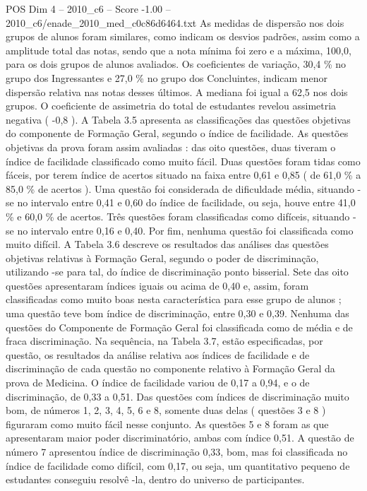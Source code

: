 \begin{textsample}{POS Dim 4 – 2010\_c6 – Score -1.00 – 2010\_c6/enade\_2010\_med\_c0c86d6464.txt}
As medidas de dispersão nos dois grupos de alunos foram similares, como indicam os desvios padrões, assim como a amplitude total das notas, sendo que a nota mínima foi zero e a máxima, 100,0, para os dois grupos de alunos avaliados.
Os coeficientes de variação, 30,4 \% no grupo dos Ingressantes e 27,0 \% no grupo dos Concluintes, indicam menor dispersão relativa nas notas desses últimos.
A mediana foi igual a 62,5 nos dois grupos.
O coeficiente de assimetria do total de estudantes revelou assimetria negativa ( -0,8 ).
A Tabela 3.5 apresenta as classificações das questões objetivas do componente de Formação Geral, segundo o índice de facilidade.
As questões objetivas da prova foram assim avaliadas : das oito questões, duas tiveram o índice de facilidade classificado como muito fácil.
Duas questões foram tidas como fáceis, por terem índice de acertos situado na faixa entre 0,61 e 0,85 ( de 61,0 \% a 85,0 \% de acertos ).
Uma questão foi considerada de dificuldade média, situando -se no intervalo entre 0,41 e 0,60 do índice de facilidade, ou seja, houve entre 41,0 \% e 60,0 \% de acertos.
Três questões foram classificadas como difíceis, situando -se no intervalo entre 0,16 e 0,40.
Por fim, nenhuma questão foi classificada como muito difícil.
A Tabela 3.6 descreve os resultados das análises das questões objetivas relativas à Formação Geral, segundo o poder de discriminação, utilizando -se para tal, do índice de discriminação ponto bisserial.
Sete das oito questões apresentaram índices iguais ou acima de 0,40 e, assim, foram classificadas como muito boas nesta característica para esse grupo de alunos ; uma questão teve bom índice de discriminação, entre 0,30 e 0,39.
Nenhuma das questões do Componente de Formação Geral foi classificada como de média e de fraca discriminação.
Na sequência, na Tabela 3.7, estão especificadas, por questão, os resultados da análise relativa aos índices de facilidade e de discriminação de cada questão no componente relativo à Formação Geral da prova de Medicina.
O índice de facilidade variou de 0,17 a 0,94, e o de discriminação, de 0,33 a 0,51.
Das questões com índices de discriminação muito bom, de números 1, 2, 3, 4, 5, 6 e 8, somente duas delas ( questões 3 e 8 ) figuraram como muito fácil nesse conjunto.
As questões 5 e 8 foram as que apresentaram maior poder discriminatório, ambas com índice 0,51.
A questão de número 7 apresentou índice de discriminação 0,33, bom, mas foi classificada no índice de facilidade como difícil, com 0,17, ou seja, um quantitativo pequeno de estudantes conseguiu resolvê -la, dentro do universo de participantes.

\end{textsample}

